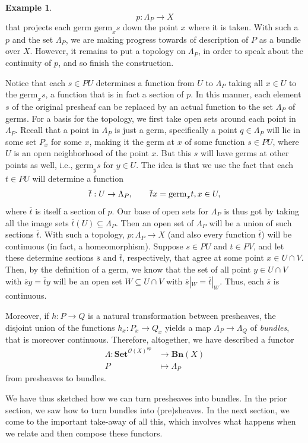 \documentclass[11pt]{book}
\theoremstyle{definition}
\newtheorem{example}{Example}[section]
\theoremstyle{definition}
\theoremstyle{definition}
\theoremstyle{theorem}
\theoremstyle{definition}
\begin{document}
\begin{example}
	\begin{equation*}
	p: \Lambda_P \rightarrow X
	\end{equation*}
	that projects each germ $\text{germ}_x s$ down the point $x$ where it is taken. With such a $p$ and the set $\Lambda_P$, we are making progress towards of description of $P$ as a bundle over $X$. However, it remains to put a topology on $\Lambda_P$, in order to speak about the continuity of $p$, and so finish the construction. \par 
	Notice that each $s \in PU$ determines a function from $U$ to $\Lambda_P$ taking all $x \in U$ to the $\text{germ}_x s$, a function that is in fact a section of $p$. In this manner, each element $s$ of the original presheaf can be replaced by an actual function to the set $\Lambda_P$ of germs. For a basis for the topology, we first take open sets around each point in $\Lambda_P$. Recall that a point in $\Lambda_P$ is just a germ, specifically a point $q \in \Lambda_P$ will lie in some set $P_x$ for some $x$, making it the germ at $x$ of some function $s \in PU$, where $U$ is an open neighborhood of the point $x$. But this $s$ will have germs at other points as well, i.e., $\text{germ}_y s$ for $y \in U$. The idea is that we use the fact that each $t \in PU$ will determine a function 
	\begin{equation*}
	\overline{t}: U \rightarrow \Lambda_P, \hspace*{2em} \overline{t}x = \text{germ}_x t, x \in U,
	\end{equation*}
	where $\overline{t}$ is itself a section of $p$.
	Our base of open sets for $\Lambda_P$ is thus got by taking all the image sets $\overline{t}(U) \subseteq  \Lambda_P$. Then an open set of $\Lambda_P$ will be a union of such sections $\overline{t}$. With such a topology, $p: \Lambda_P \rightarrow X$ (and also every function $\overline{t}$) will be continuous (in fact, a homeomorphism). Suppose $s \in PU$ and $t \in PV$, and let these determine sections $\overline{s}$ and $\overline{t}$, respectively, that agree at some point $x \in U \cap V$. Then, by the definition of a germ, we know that the set of all point $y \in U \cap V$ with $\overline{s}y = \overline{t}y$ will be an open set $W \subseteq  U \cap V$ with $\overline{s}|_W = \overline{t}|_W$. Thus, each $\overline{s}$ is continuous. \par 
	Moreover, if $h: P \rightarrow Q$ is a natural transformation between presheaves, the disjoint union of the functions $h_x: P_x \rightarrow Q_x$ yields a map $\Lambda_P \rightarrow \Lambda_Q$ of \textit{bundles}, that is moreover continuous. Therefore, altogether, we have described a functor 
	\begin{align*}
	\Lambda: \textbf{Set}^{\mathscr{O}(X)^{op}} & \rightarrow \textbf{Bn}(X) \\ 
	P & \mapsto \Lambda_P 
	\end{align*}
	from presheaves to bundles.\par 
	We have thus sketched how we can turn presheaves into bundles. In the prior section, we saw how to turn bundles into (pre)sheaves. In the next section, we come to the important take-away of all this, which involves what happens when we relate and then compose these functors. 

\end{example}
\end{document}
